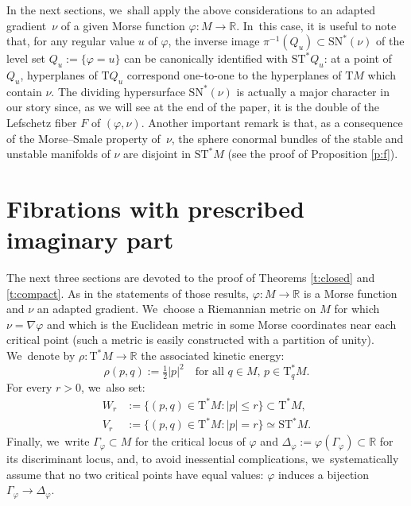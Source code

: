 \documentclass[JEP,XML,SOM,Unicode]{cedram}
\newcommand{\R}{{\mathbb R}}
\newcommand{\Crit}{\Gamma_{\!\varphi}}
\newcommand{\Discr}{\Delta_\varphi}
\newcommand{\sSN}{\mathrm{SN}^\ast}
\newcommand{\sT}{\mathrm{T}^\ast}
\newcommand{\sST}{\mathrm{ST}^\ast}
\newcommand{\rT}{\mathrm{T}}
\newcommand{\de}{\mathrel{:=}}
\newcommand{\with}{\mathrel{:}}
\let\on\colon
\theoremstyle{plain}
\theoremstyle{definition}
\begin{document}
In the next sections, we~shall apply the above considerations to an adapted
gradient~$\nu$ of a given Morse function $\varphi \on M \to \R$. In~this case,
it is useful to note that, for any regular value $u$ of $\varphi$, the inverse
image $\pi^{-1}(Q_u) \subset \sSN(\nu)$ of the level set $Q_u \de \{\varphi=u\}$
can be canonically identified with $\sST Q_u$: at a point of $Q_u$, hyperplanes
of $\rT Q_u$ correspond one-to-one to the hyperplanes of $\rT M$ which contain
$\nu$. The dividing hypersurface $\sSN(\nu)$ is actually a major character in
our story since, as we will see at the end of the paper, it is the double of the
Lefschetz fiber $F$ of $(\varphi,\nu)$. Another important remark is that, as a
consequence of the Morse--Smale property of~$\nu$, the sphere conormal bundles
of the stable and unstable manifolds of $\nu$ are disjoint in $\sST M$ (see the
proof of Proposition \ref{p:f}).

\section{Fibrations with prescribed imaginary part} \label{s:lf-criterion}

The next three sections are devoted to the proof of Theorems \ref{t:closed} and
\ref{t:compact}. As in the statements of those results, $\varphi \on M \to \R$
is a Morse function and $\nu$ an adapted gradient. We~choose a Riemannian metric
on $M$ for which $\nu = \nabla\varphi$ and which is the Euclidean metric in some
Morse coordinates near each critical point (such a metric is easily constructed
with a partition of unity). We~denote by $\rho \on \sT M \to \R$ the associated
kinetic energy:
\[
\rho(p,q) \de \tfrac12 |p|^2 \quad
 \text{for all $q \in M$, $p \in \sT_qM$.}
\]
For every $r>0$, we~also set:
\begin{align*}
	W_r &\de \{(p,q) \in \sT M \with |p| \le r\} \subset \sT M, \\
	V_r &\de \{(p,q) \in \sT M \with |p| = r\} \simeq \sST M.
\end{align*}
Finally, we~write $\Crit \subset M$ for the critical locus of $\varphi$ and
$\Discr \de \varphi(\Crit) \subset \R$ for its discriminant locus, and, to avoid
inessential complications, we~systematically assume that no two critical points
have equal values: $\varphi$ induces a bijection $\Crit \to \Discr$.
\end{document}
